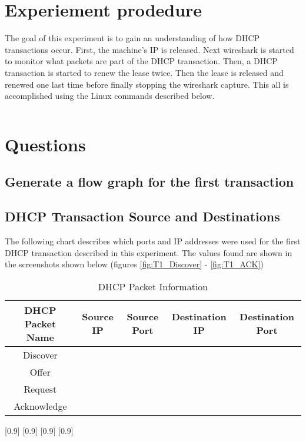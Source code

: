 \documentclass{assignment-x}
\begin{document}
\maketitle
\pagebreak
\section{Experiement prodedure}
The goal of this experiment is to gain an understanding of how DHCP transactions occur. First, the machine's IP is released. Next wireshark is started to monitor what packets are part of the DHCP transaction. Then, a DHCP transaction is started to renew the lease twice. Then the lease is released and renewed one last time before finally stopping the wireshark capture.
This all is accomplished using the Linux commands described below.
\inputminted{bash}{./linux-commands.sh}

\section{Questions}
\subsection{Generate a flow graph for the first transaction}

\subsection{DHCP Transaction Source and Destinations}
The following chart describes which ports and IP addresses were used for the first DHCP transaction described in this experiment. The values found are shown in the screenshots shown below (figures \ref{fig:T1_Discover} - \ref{fig:T1_ACK})
\begin{table}[h]
    \centering
    \caption{DHCP Packet Information}
    
    \begin{tabular}{|c|c|c|c|c|}
        \hline
        DHCP Packet Name & Source IP & Source Port & Destination IP & Destination Port \\
        \hline
        Discover & & & & \\
        \hline
        Offer & & & & \\
        \hline
        Request & & & & \\
        \hline
        Acknowledge & & & & \\
        \hline
    \end{tabular}
\end{table}

\begin{landscape}
    \begin{multicols}{2}
    [0.9\linewidth]
    [0.9\linewidth]
    \columnbreak
    [0.9\linewidth]
    [0.9\linewidth]
    \end{multicols}
\end{landscape}
\end{document}
